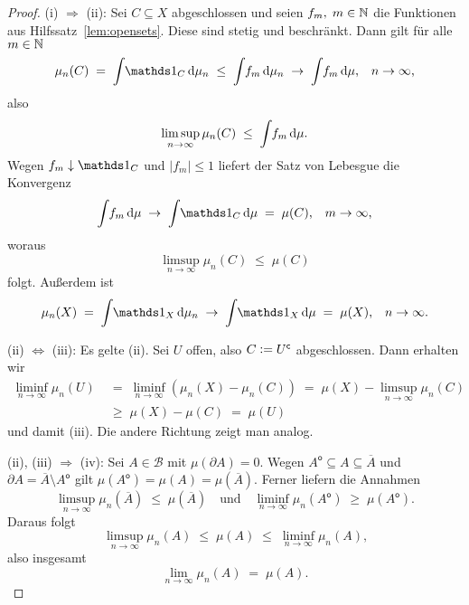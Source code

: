 \documentclass[../main/main.tex]{subfiles}
\begin{document}
	\begin{proof}
		(i) $\Rightarrow$ (ii): Sei $C \subseteq X$ abgeschlossen und seien 
		$f_m, \; m \in \mathbb{N}$ die Funktionen aus Hilfssatz~\ref{lem:opensets}. 
		Diese sind stetig und beschränkt.
		Dann gilt für alle $m \in \mathbb{N}$
		$$\mu_n(C) \; = \; \measureint{}{\indfct_C}{\mu_n} \; \leq \; 
		\measureint{}{f_m}{\mu_n} \; \to \;
		\measureint{}{f_m}{\mu} \text{,} \quad n \to \infty \text{,}$$
		also 
		$$\limsup_{n \to \infty} \mu_n(C) \; \leq \; 
		\int_{} \, f_m \, \mathrm{d}\mu \text{.}$$
		Wegen $f_m \convdown \indfct_C$ und $| f_m | \leq 1$ 
		liefert der Satz von Lebesgue die Konvergenz
		$$\measureint{}{f_m}{\mu} \; \to \;
		\measureint{}{\indfct_C}{\mu} \; = \; \mu(C) \text{,} 
		\quad m \to \infty \text{,}$$
		woraus
		$$\limsup_{n \to \infty} \mu_n(C) \; \leq \; \mu(C)$$
		folgt. Außerdem ist 
		$$\mu_n(X) \; = \; \measureint{}{\indfct_{X}}{\mu_n} \; \to \; \measureint{}{\indfct_{X}}{\mu} \; = \; \mu(X) \text{,} \quad n \to \infty \text{.}$$
		
		(ii) $\Leftrightarrow$ (iii): Es gelte (ii). Sei $U$ offen, also 
		$C \vcentcolon = U^\mathsf{c}$ abgeschlossen. Dann erhalten wir
		\begin{align*}
			\liminf_{n \to \infty} \mu_n(U) \; &= \; \liminf_{n \to \infty} (\mu_n(X) - \mu_n(C)) \; = \;
			\mu(X) - \limsup_{n \to \infty} \mu_n(C) \\
			&\geq \; 
			\mu(X) - \mu(C) \; = \; \mu(U)
		\end{align*}
		und damit (iii). Die andere Richtung zeigt man analog.
		
		(ii), (iii) $\Rightarrow$ (iv): Sei $A \in \mathcal{B}$ mit 
		$\mu(\partial A) = 0$. Wegen
		$A^\mathsf{o} \subseteq A \subseteq \overline{A}$ und 
		$\partial A = \overline{A} \setminus A^\mathsf{o}$ gilt $\mu(A^\mathsf{o}) = 
		\mu(A) = \mu(\overline{A}) \text{.}$
		Ferner liefern die Annahmen
		$$\limsup_{n \to \infty} \mu_n(\overline{A}) \; \leq \; 
		\mu(\overline{A}) \quad \text{und} \quad 
		\liminf_{n \to \infty} \mu_n(A^\mathsf{o}) \; \geq \; 
		\mu(A^\mathsf{o}) \text{.}$$
		Daraus folgt
		$$\limsup_{n \to \infty} \mu_n(A) \; \leq \; 
		\mu(A) \; \leq \; \liminf_{n \to \infty} \mu_n(A) \text{,}$$
		also insgesamt
		$$\lim_{n \to \infty} \mu_n(A) \; = \; \mu(A) \text{.}$$
		

\end{proof}
\end{document}
